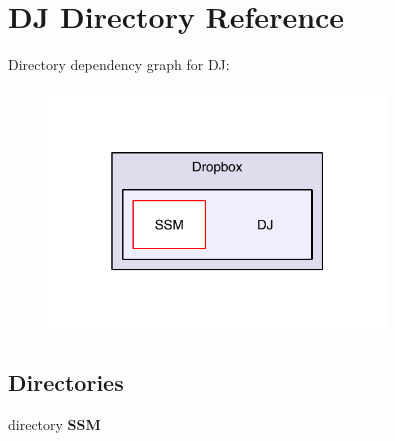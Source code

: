 \section{D\-J Directory Reference}
\label{dir_beeca0844f0b986207508ef8a897f9be}
Directory dependency graph for D\-J\-:
\nopagebreak
\begin{figure}[H]
\begin{center}
\leavevmode
\includegraphics[width=254pt]{dir_beeca0844f0b986207508ef8a897f9be_dep}
\end{center}
\end{figure}
\subsection*{Directories}
\begin{DoxyCompactItemize}
\item 
directory {\bf S\-S\-M}
\end{DoxyCompactItemize}
